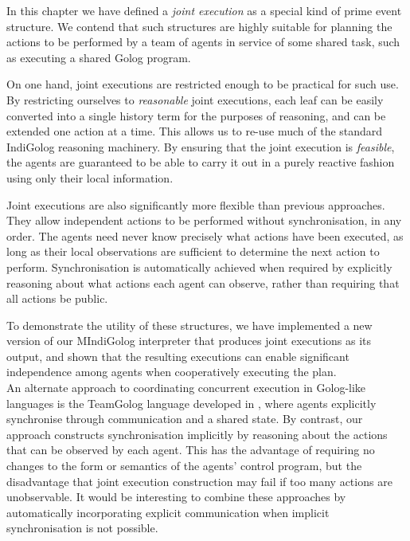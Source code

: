 In this chapter we have defined a \emph{joint execution} as a special
kind of prime event structure. We contend that such structures are
highly suitable for planning the actions to be performed by a team
of agents in service of some shared task, such as executing a shared
Golog program.

On one hand, joint executions are restricted enough to be practical
for such use. By restricting ourselves to \emph{reasonable} joint
executions, each leaf can be easily converted into a single history
term for the purposes of reasoning, and can be extended one action
at a time. This allows us to re-use much of the standard IndiGolog
reasoning machinery. By ensuring that the joint execution is \emph{feasible},
the agents are guaranteed to be able to carry it out in a purely reactive
fashion using only their local information.

Joint executions are also significantly more flexible than previous
approaches. They allow independent actions to be performed without
synchronisation, in any order. The agents need never know precisely
what actions have been executed, as long as their local observations
are sufficient to determine the next action to perform. Synchronisation
is automatically achieved when required by explicitly reasoning about
what actions each agent can observe, rather than requiring that all
actions be public.

To demonstrate the utility of these structures, we have implemented
a new version of our MIndiGolog interpreter that produces joint executions
as its output, and shown that the resulting executions can enable
significant independence among agents when cooperatively executing
the plan.\\


An alternate approach to coordinating concurrent execution in Golog-like
languages is the TeamGolog language developed in \citep{farinelli07team_golog},
where agents explicitly synchronise through communication and a shared
state. By contrast, our approach constructs synchronisation implicitly
by reasoning about the actions that can be observed by each agent.
This has the advantage of requiring no changes to the form or semantics
of the agents' control program, but the disadvantage that joint execution
construction may fail if too many actions are unobservable. It would
be interesting to combine these approaches by automatically incorporating
explicit communication when implicit synchronisation is not possible.

